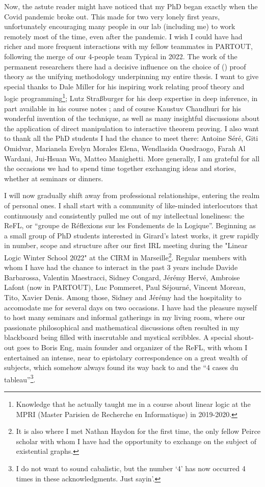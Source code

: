 Now, the astute reader might have noticed that my PhD began exactly when the Covid pandemic broke out. This made for two very lonely first years, unfortunately encouraging many people in our lab (including me) to work remotely most of the time, even after the pandemic. I wish I could have had richer and more frequent interactions with my fellow teammates in PARTOUT, following the merge of our 4-people team Typical in 2022. The work of the permanent researchers there had a decisive influence on the choice of () proof theory as the unifying methodology underpinning my entire thesis. I want to give special thanks to Dale Miller for his inspiring work relating proof theory and logic programming\footnote{Knowledge that he actually taught me in a course about linear logic at the MPRI (Master Parisien de Recherche en Informatique) in 2019-2020.}; Lutz Straßburger for his deep expertise in deep inference, in part available in his course notes \cite{tubella:hal-02390267}; and of course Kaustuv Chaudhuri for his wonderful invention of the  technique, as well as many insightful discussions about the application of direct manipulation to interactive theorem proving. I also want to thank all the PhD students I had the chance to meet there: Antoine Séré, Giti Omidvar, Marianela Evelyn Morales Elena, Wendlasida Ouedraogo, Farah Al Wardani, Jui-Hsuan Wu, Matteo Manighetti. More generally, I am grateful for all the occasions we had to spend time together exchanging ideas and stories, whether at seminars or dinners.

I will now gradually shift away from professional relationships, entering the realm of personal ones. I shall start with a community of like-minded interlocutors that continuously and consistently pulled me out of my intellectual loneliness: the ReFL, or ``groupe de Réflexions sur les Fondements de la Logique''. Beginning as a small group of PhD students interested in Girard's latest works, it grew rapidly in number, scope and structure after our first IRL meeting during the "Linear Logic Winter School 2022" at the CIRM in Marseille\footnote{It is also where I met Nathan Haydon for the first time, the only fellow Peirce scholar with whom I have had the opportunity to exchange on the subject of existential graphs.}. Regular members with whom I have had the chance to interact in the past 3 years include Davide Barbarossa, Valentin Maestracci, Sidney Congard, Jérémy Hervé, Ambroise Lafont (now in PARTOUT), Luc Pommeret, Paul Séjourné, Vincent Moreau, Tito, Xavier Denis. Among those, Sidney and Jérémy had the hospitality to accomodate me for several days on two occasions. I have had the pleasure myself to host many seminars and informal gatherings in my living room, where our passionate philosophical and mathematical discussions often resulted in my blackboard being filled with inscrutable and mystical scribbles. A special shout-out goes to Boris Eng, main founder and organizer of the ReFL, with whom I entertained an intense, near to epistolary correspondence on a great wealth of subjects, which somehow always found its way back to  and the ``4 cases du tableau''\footnote{I do not want to sound cabalistic, but the number `4' has now occurred 4 times in these acknowledgments. Just sayin'.}.